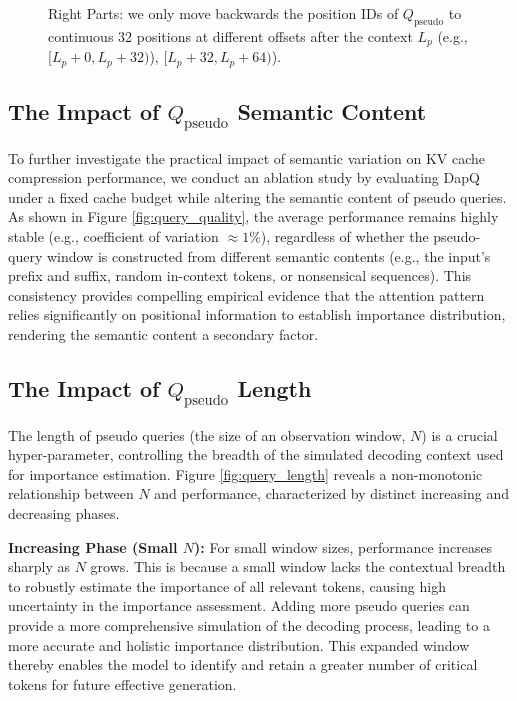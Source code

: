 \begin{figure}
{Right Parts: we only move backwards the position IDs of \texorpdfstring{\(Q_{\text{pseudo}}\)}{Q\_pseudo} to continuous 32 positions at different offsets after the context $L_p$ (e.g., $[L_p+0, L_p+32)$), $[L_p+32, L_p+64)$).}
    \vspace{-14pt}
\end{figure}






\subsection{The Impact of \texorpdfstring{\(Q_{\text{pseudo}}\)}{Q\_pseudo} Semantic Content} 
 To further investigate the practical impact of semantic variation on KV cache compression performance, we conduct an ablation study by evaluating DapQ under a fixed cache budget while altering the semantic content of pseudo queries. As shown in Figure \ref{fig:query_quality}, the average performance remains highly stable (e.g., coefficient of variation $\approx 1\%$), regardless of whether the pseudo-query window is constructed from different semantic contents (e.g., the input's prefix and suffix, random in-context tokens, or nonsensical sequences). This consistency provides compelling empirical evidence that the attention pattern relies significantly on positional information to establish importance distribution, rendering the semantic content a secondary factor.



\subsection{The Impact of \texorpdfstring{\(Q_{\text{pseudo}}\)}{Q\_pseudo} Length}
The length of pseudo queries (the size of an observation window, $N$) is a crucial hyper-parameter, controlling the breadth of the simulated decoding context used for importance estimation. Figure \ref{fig:query_length} reveals a non-monotonic relationship between $N$ and performance, characterized by distinct increasing and decreasing phases.


\textbf{Increasing Phase (Small $N$):} For small window sizes, performance increases sharply as $N$ grows. This is because a small window lacks the contextual breadth to robustly estimate the importance of all relevant tokens, causing high uncertainty in the importance assessment. Adding more pseudo queries can provide a more comprehensive simulation of the decoding process, leading to a more accurate and holistic importance distribution. This expanded window thereby enables the model to identify and retain a greater number of critical tokens for future effective generation.


